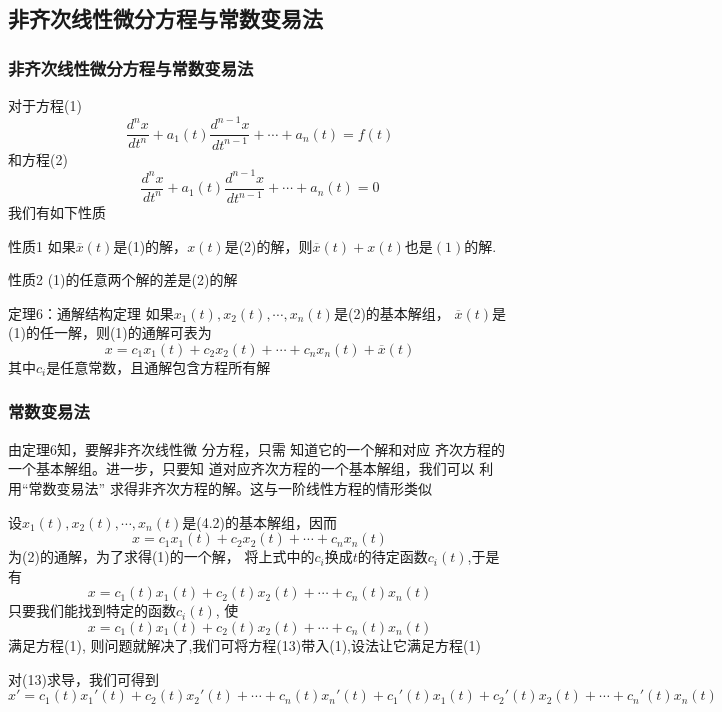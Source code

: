 \documentclass[aspectratio=169, 10pt, utf8, mathserif]{beamer}
\begin{document}
	\subsection{非齐次线性微分方程与常数变易法}
	\begin{frame}
		\frametitle{非齐次线性微分方程与常数变易法}
		对于方程(1)
		\begin{equation*}
				\frac{d^nx}{dt^n}+a_1\left( t \right) \frac{d^{n-1}x}{dt^{n-1}}+\cdots +a_n\left( t \right) =f\left( t \right)
		\end{equation*}
		和方程(2)
		\begin{equation*}
				\frac{d^nx}{dt^n}+a_1\left( t \right) \frac{d^{n-1}x}{dt^{n-1}}+\cdots +a_n\left( t \right) =0
		\end{equation*}
		我们有如下性质
		\begin{block}{性质1}
		 如果$\overline{x}(t)$是(1)的解，$x(t)$是(2)的解，则$\overline{x}(t)+x(t)\text{也是}(1)\text{的解}$.
		\end{block}
		\begin{block}{性质2}
			(1)的任意两个解的差是(2)的解
		\end{block}
	\end{frame}
	\begin{frame}
		\begin{block}{定理6：通解结构定理}
			如果$x_1(t),x_2(t),\cdots,x_n(t)$是(2)的基本解组， $\overline{x}(t)$是(1)的任一解，则(1)的通解可表为
			\begin{equation}
				x=c_1x_1(t)+c_2x_2(t)+\cdots+c_nx_n(t)+\overline{x}(t)
			\end{equation}
			其中$c_i$是任意常数，且通解包含方程所有解
		\end{block}
	\end{frame}
	\begin{frame}
		\frametitle{常数变易法}
		由定理6知，要解非齐次线性微 分方程，只需
		知道它的一个解和对应 齐次方程的一个基本解组。进一步，只要知 道对应齐次方程的一个基本解组，我们可以 利用“常数变易法” 求得非齐次方程的解。这与一阶线性方程的情形类似
	\end{frame}
	\begin{frame}
		设$x_1(t),x_2(t),\cdots,x_n(t)$是(4.2)的基本解组，因而
		\begin{equation}
			x=c_1x_1(t)+c_2x_2(t)+\cdots+c_nx_n(t)
		\end{equation}
		 为(2)的通解，为了求得(1)的一个解， 将上式中的$c_i$换成$t$的待定函数$c_i(t)$,于是有
		 \begin{equation}
		 	x=c_1(t)x_1(t)+c_2(t)x_2(t)+\cdots+c_n(t)x_n(t)
		 \end{equation}
		 只要我们能找到特定的函数$c_i(t)$, 使
		 \begin{equation*}
		 	x=c_1(t)x_1(t)+c_2(t)x_2(t)+\cdots+c_n(t)x_n(t)
		 \end{equation*}
		 满足方程(1), 则问题就解决了,我们可将方程(13)带入(1),设法让它满足方程(1)
		 
		 对(13)求导，我们可得到
		 \begin{equation}
		 	x'=c_1(t)x_1'(t)+c_2(t)x_2'(t)+\cdots+c_n(t)x_n'(t)+c_1'(t)x_1(t)+c_2'(t)x_2(t)+\cdots+c_n'(t)x_n(t)
		 \end{equation}
	\end{frame}
\end{document}
